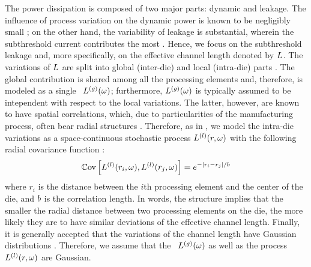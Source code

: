 The power dissipation is composed of two major parts: dynamic and leakage. The influence of process variation on the dynamic power is known to be negligibly small \cite{juan2011, juan2012, srivastava2010}; on the other hand, the variability of leakage is substantial, wherein the subthreshold current contributes the most \cite{juan2011, juan2012}. Hence, we focus on the subthreshold leakage and, more specifically, on the effective channel length denoted by $L$. The variations of $L$ are split into global (inter-die) and local (intra-die) parts \cite{chandra2010, juan2011, juan2012, srivastava2010, shen2009}. The global contribution is shared among all the processing elements and, therefore, is modeled as a single \rv\ ${L^{(g)}}(\omega)$; furthermore, ${L^{(g)}}(\omega)$ is typically assumed to be intependent with respect to the local variations. The latter, however, are known to have spatial correlations, which, due to particularities of the manufacturing process, often bear radial structures \cite{friedberg2005, cheng2011}. Therefore, as in \cite{ghanta2006}, we model the intra-die variations as a space-continuous stochastic process $L^{(l)}(r, \omega)$ with the following radial covariance function \cite{ghanem1991}:
\begin{equation} \elabel{covariance-function}
  \oCov{\lLeff(r_i, \o), \lLeff(r_j, \o)} = e^{-|r_i - r_j|/\corrLength}
\end{equation}
where $r_i$ is the distance between the $i$th processing element and the center of the die, and $b$ is the correlation length. In words, the structure implies that the smaller the radial distance between two processing elements on the die, the more likely they are to have similar deviations of the effective channel length. Finally, it is generally accepted that the variations of the channel length have Gaussian distributions \cite{juan2011, juan2012, srivastava2010}. Therefore, we assume that the \rv\ ${L^{(g)}}(\omega)$ as well as the process $L^{(l)}(r, \omega)$ are Gaussian.

%

